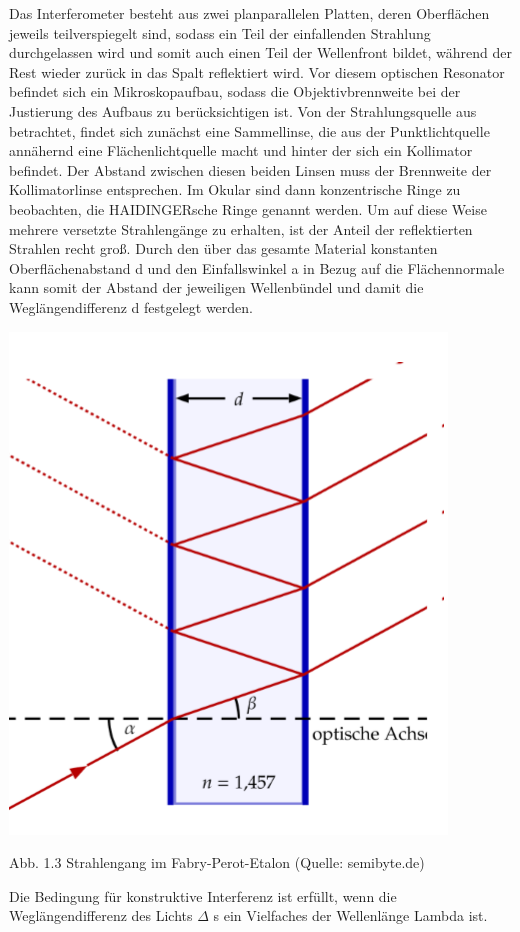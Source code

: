 \documentclass[10pt,a4paper]{article}
\begin{document}
	Das Interferometer besteht aus zwei planparallelen Platten, deren Oberflächen jeweils teilverspiegelt sind, sodass ein Teil der einfallenden Strahlung durchgelassen wird und somit auch einen Teil der Wellenfront bildet, während der Rest wieder zurück in das Spalt reflektiert wird. Vor diesem optischen Resonator befindet sich ein Mikroskopaufbau, sodass die Objektivbrennweite bei der Justierung des Aufbaus zu berücksichtigen ist. Von der Strahlungsquelle aus betrachtet, findet sich zunächst eine Sammellinse, die aus der Punktlichtquelle annähernd eine Flächenlichtquelle macht und hinter der sich ein Kollimator befindet. Der Abstand zwischen diesen beiden Linsen muss der Brennweite der Kollimatorlinse entsprechen. Im Okular sind dann konzentrische Ringe zu beobachten, die HAIDINGERsche Ringe genannt werden. Um auf diese Weise mehrere versetzte Strahlengänge zu erhalten, ist der Anteil der reflektierten Strahlen recht groß. Durch den über das gesamte Material konstanten Oberflächenabstand d und den Einfallswinkel a in Bezug auf die Flächennormale kann somit der Abstand der jeweiligen Wellenbündel und damit die Weglängendifferenz d festgelegt werden.


\includegraphics{fab}

Abb. 1.3 Strahlengang im Fabry-Perot-Etalon (Quelle: semibyte.de)


Die Bedingung für konstruktive Interferenz ist erfüllt, wenn die Weglängendifferenz des Lichts $\Delta$ s ein Vielfaches der Wellenlänge Lambda ist.\\
\end{document}

